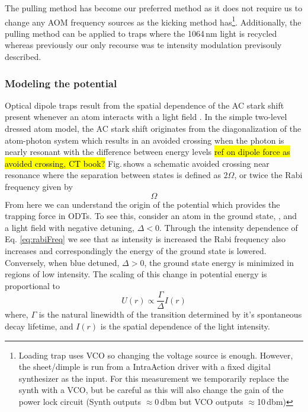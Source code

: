 The pulling method has become our preferred method as it does not require us to change any AOM frequency sources as the kicking method has\footnote{Loading trap uses VCO so changing the voltage source is enough. However, the sheet/dimple is run from a IntraAction driver with a fixed digital synthesizer as the input. For this measurement we temporarily replace the synth with a VCO, but be careful as this will also change the gain of the power lock circuit (Synth outputs $\approx$0\,dbm but VCO outputs $\approx$10\,dbm)}.
Additionally, the pulling method can be applied to traps where the 1064\,nm light is recycled whereas previously our only recourse was te intensity modulation previsouly described.

\subsubsection{Modeling the potential} \label{sssec:1064_modeling}
Optical dipole traps result from the spatial dependence of the AC stark shift present whenever an atom interacts with a light field \cite{Grimm1999a}.
In the simple two-level dressed atom model, the AC stark shift originates from the diagonalization of the atom-photon system which results in an avoided crossing when the photon is nearly resonant with the difference between energy levels \hl{ref on dipole force as avoided crossing, CT book?}
Fig.\,shows a schematic avoided crossing near resonance where the separation between states is defined as $2\Omega$, or twice the Rabi frequency given by
\begin{equation}
	\Omega
	\label{eq:rabiFreq}
\end{equation}
From here we can understand the origin of the potential which provides the trapping force in ODTs.
To see this, consider an atom in the ground state, , and a light field with negative detuning, $\Delta < 0$.
Through the intensity dependence of Eq. \ref{eq:rabiFreq} we see that as intensity is increased the Rabi frequency also increases and correspondingly the energy of the ground state is lowered.
Conversely, when blue detuned, $\Delta>0$, the ground state energy is minimized in regions of low intensity.
The scaling of this change in potential energy is proportional to
\begin{equation} \label{eq:potProp}
	U(r) \varpropto \frac{\Gamma}{\Delta}I(r)
\end{equation}
where, $\Gamma$ is the natural linewidth of the transition determined by it's spontaneous decay lifetime, and $I(r)$ is the spatial dependence of the light intensity.

